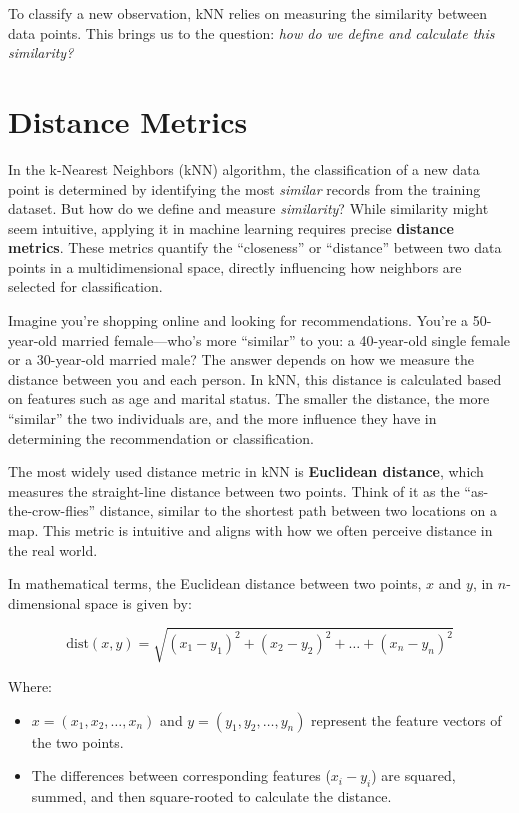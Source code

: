 \documentclass[
]{book}
\providecommand{\tightlist}{%
  \setlength{\itemsep}{0pt}\setlength{\parskip}{0pt}}
\theoremstyle{definition}
\theoremstyle{definition}
\theoremstyle{definition}
\theoremstyle{definition}
\theoremstyle{remark}
\begin{document}
To classify a new observation, kNN relies on measuring the similarity between data points. This brings us to the question: \emph{how do we define and calculate this similarity?}

\section{Distance Metrics}\label{distance-metrics}

In the k-Nearest Neighbors (kNN) algorithm, the classification of a new data point is determined by identifying the most \emph{similar} records from the training dataset. But how do we define and measure \emph{similarity}? While similarity might seem intuitive, applying it in machine learning requires precise \textbf{distance metrics}. These metrics quantify the ``closeness'' or ``distance'' between two data points in a multidimensional space, directly influencing how neighbors are selected for classification.

Imagine you're shopping online and looking for recommendations. You're a 50-year-old married female---who's more ``similar'' to you: a 40-year-old single female or a 30-year-old married male? The answer depends on how we measure the distance between you and each person. In kNN, this distance is calculated based on features such as age and marital status. The smaller the distance, the more ``similar'' the two individuals are, and the more influence they have in determining the recommendation or classification.

The most widely used distance metric in kNN is \textbf{Euclidean distance}, which measures the straight-line distance between two points. Think of it as the ``as-the-crow-flies'' distance, similar to the shortest path between two locations on a map. This metric is intuitive and aligns with how we often perceive distance in the real world.

In mathematical terms, the Euclidean distance between two points, \(x\) and \(y\), in \(n\)-dimensional space is given by:

\[
\text{dist}(x, y) = \sqrt{(x_1 - y_1)^2 + (x_2 - y_2)^2 + \ldots + (x_n - y_n)^2} 
\]

Where:

\begin{itemize}
\tightlist
\item
  \(x = (x_1, x_2, \ldots, x_n)\) and \(y = (y_1, y_2, \ldots, y_n)\) represent the feature vectors of the two points.\\
\item
  The differences between corresponding features (\(x_i - y_i\)) are squared, summed, and then square-rooted to calculate the distance.
\end{itemize}
\end{document}
